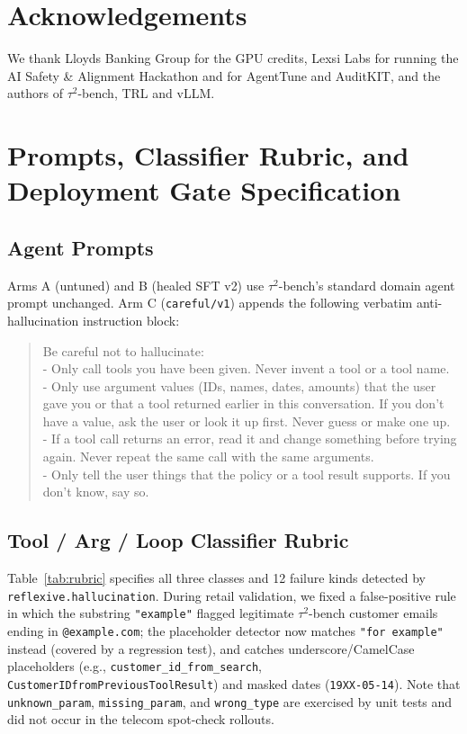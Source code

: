 \documentclass[11pt]{article}
\begin{document}
\section*{Acknowledgements}
We thank Lloyds Banking Group for the GPU credits, Lexsi Labs for running the AI Safety \& Alignment Hackathon and for AgentTune and AuditKIT, and the authors of $\tau^2$-bench, TRL and vLLM.




\clearpage
\appendix
\renewcommand{\arraystretch}{1.15}


\section{Prompts, Classifier Rubric, and Deployment Gate Specification}
\label{app:rubric}

\subsection{Agent Prompts}
\label{app:prompts}
Arms A (untuned) and B (healed SFT v2) use $\tau^2$-bench's standard domain agent prompt unchanged. Arm C (\texttt{careful/v1}) appends the following verbatim anti-hallucination instruction block:
\begin{quote}\small\ttfamily
Be careful not to hallucinate:\\
- Only call tools you have been given. Never invent a tool or a tool name.\\
- Only use argument values (IDs, names, dates, amounts) that the user gave you or that a tool returned earlier in this conversation. If you don't have a value, ask the user or look it up first. Never guess or make one up.\\
- If a tool call returns an error, read it and change something before trying again. Never repeat the same call with the same arguments.\\
- Only tell the user things that the policy or a tool result supports. If you don't know, say so.
\end{quote}

\subsection{Tool / Arg / Loop Classifier Rubric}
Table~\ref{tab:rubric} specifies all three classes and 12 failure kinds detected by \texttt{reflexive.hallucination}. During retail validation, we fixed a false-positive rule in which the substring \texttt{"example"} flagged legitimate $\tau^2$-bench customer emails ending in \texttt{@example.com}; the placeholder detector now matches \texttt{"for example"} instead (covered by a regression test), and catches underscore/CamelCase placeholders (e.g., \texttt{customer\_id\_from\_search}, \texttt{CustomerIDfromPreviousToolResult}) and masked dates (\texttt{19XX-05-14}). Note that \texttt{unknown\_param}, \texttt{missing\_param}, and \texttt{wrong\_type} are exercised by unit tests and did not occur in the telecom spot-check rollouts.
\end{document}
